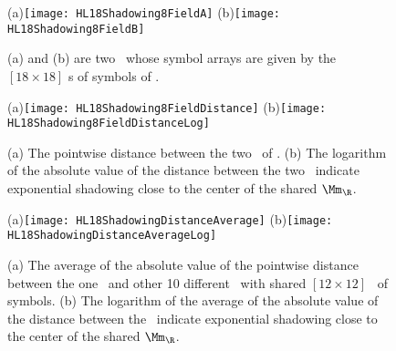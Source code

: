 \begin{description}
\begin{figure}
  \centering
(a)\texttt{[image: HL18Shadowing8FieldA]}
(b)\texttt{[image: HL18Shadowing8FieldB]}
  \caption{\label{fig:HL18Shadowing8Field}
(a) and (b) are two \twots\ whose symbol arrays are given by the $[18\times18]$ \brick s of symbols of .
}
\end{figure}

\begin{figure}
  \centering
(a)\texttt{[image: HL18Shadowing8FieldDistance]}
(b)\texttt{[image: HL18Shadowing8FieldDistanceLog]}
  \caption{\label{fig:HL18Shadowing8Distance}
(a) The pointwise distance between the two \twots\ of .
(b) The logarithm of the absolute value of the distance between the two \twots\ indicate exponential shadowing close to the center of the shared $\Mm_\R$.
}
\end{figure}

	
\begin{figure}
  \centering
(a)\texttt{[image: HL18ShadowingDistanceAverage]}
(b)\texttt{[image: HL18ShadowingDistanceAverageLog]}
  \caption{\label{fig:HL18Shadowing12DistanceAverage}
(a) The average of the absolute value of the pointwise distance between the one \twot\ and other 10 different \twots\ with shared $[12\times12]$ \brick\ of symbols.
(b) The logarithm of the average of the absolute value of the distance between the \twots\ indicate exponential shadowing close to the center of the shared $\Mm_\R$.
}
\end{figure}


\end{description}
